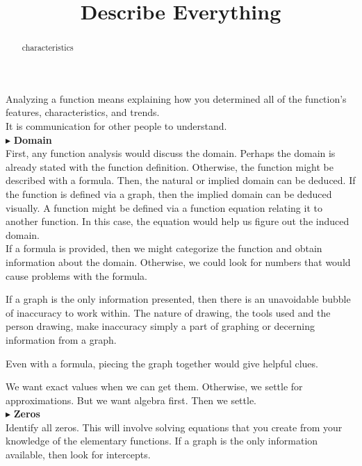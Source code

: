 \documentclass{ximera}
\title{Describe Everything}
\begin{document}
\begin{abstract}
characteristics
\end{abstract}
\maketitle




Analyzing a function means explaining how you determined all of the function's features, characteristics, and trends. \\

It is communication for other people to understand. \\






$\blacktriangleright$ \textbf{\textcolor{red!10!blue!90!}{Domain}}   \\
First, any function analysis would discuss the domain.  Perhaps the domain is already stated with the function definition. Otherwise, the function might be described with a formula. Then, the natural or implied domain can be deduced.  If the function is defined via a graph, then the implied domain can be deduced visually. A function might be defined via a function equation relating it to another function.  In this case, the equation would help us figure out the induced domain.\\

If a formula is provided, then we might categorize the function and obtain information about the domain.  Otherwise, we could look for numbers that would cause problems with the formula.

If a graph is the only information presented, then there is an unavoidable bubble of inaccuracy to work within.  The nature of drawing, the tools used and the person drawing, make inaccuracy simply a part of graphing or decerning information from a graph.

Even with a formula, piecing the graph together would give helpful clues. 

We want exact values when we can get them.  Otherwise, we settle for approximations. But we want algebra first.  Then we settle.\\









$\blacktriangleright$ \textbf{\textcolor{red!10!blue!90!}{Zeros}} \\
Identify all zeros.  This will involve solving equations that you create from your knowledge of the elementary functions. If a graph is the only information available, then look for intercepts.\\
\end{document}
